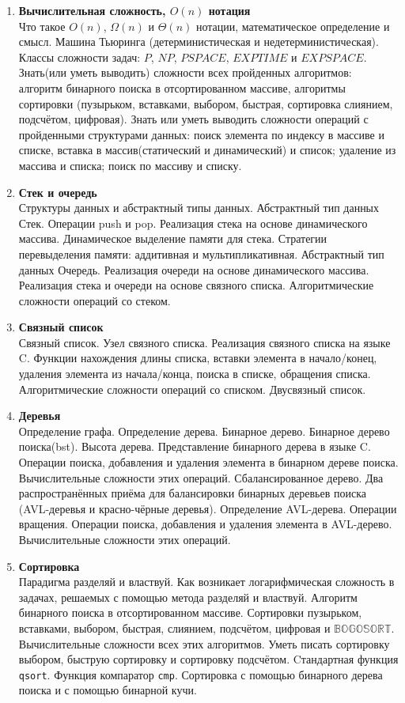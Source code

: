 \documentclass{article}
\begin{document}
\begin{enumerate}
\item  \textbf{Вычислительная сложность, $O(n)$ нотация}\\
Что такое $O(n)$, $\Omega(n)$ и $\Theta(n)$ нотации, математическое определение и смысл. Машина Тьюринга (детерминистическая и недетерминистическая). Классы сложности задач: $P$, $NP$, $PSPACE$, $EXPTIME$ и $EXPSPACE$.
Знать(или уметь выводить) сложности всех пройденных алгоритмов: алгоритм бинарного поиска в отсортированном массиве, алгоритмы сортировки (пузырьком, вставками, выбором, быстрая, сортировка слиянием, подсчётом, цифровая). Знать или уметь выводить сложности операций с пройденными структурами данных: поиск элемента по индексу в массиве и списке, вставка в массив(статический и динамический) и список; удаление из массива и списка; поиск по массиву и списку.


\item  \textbf{Стек и очередь}\\
Структуры данных и абстрактный типы данных. Абстрактный тип данных Стек. Операции push и pop. Реализация стека на основе динамического массива. Динамическое выделение памяти для стека. Стратегии перевыделения памяти: аддитивная и мультипликативная. Абстрактный тип данных Очередь. Реализация очереди на основе динамического массива. Реализация стека и очереди на основе связного списка. Алгоритмические сложности операций со стеком.

\item \textbf{Связный список}\\
Связный список. Узел связного списка. Реализация связного списка на языке C. Функции нахождения длины списка, вставки элемента в начало/конец, удаления элемента из начала/конца, поиска в списке, обращения списка. Алгоритмические сложности операций со списком. Двусвязный список.


\item \textbf{Деревья}\\
Определение графа. Определение дерева. Бинарное дерево. Бинарное дерево поиска(bst). Высота дерева. Представление бинарного дерева в языке C. Операции поиска, добавления и удаления элемента в бинарном дереве поиска. Вычислительные сложности этих операций. Сбалансированное дерево. Два распространённых приёма для балансировки бинарных деревьев поиска (AVL-деревья и красно-чёрные деревья). Определение AVL-дерева. Операции вращения. Операции поиска, добавления и удаления элемента в AVL-дерево. Вычислительные сложности этих операций.


\item \textbf{Сортировка}\\
Парадигма разделяй и властвуй. Как возникает логарифмическая сложность в задачах, решаемых с помощью метода разделяй и властвуй. Алгоритм бинарного поиска в отсортированном массиве.
Сортировки пузырьком, вставками, выбором, быстрая, слиянием, подсчётом, цифровая и $\mathbb{BOGOSORT}$. Вычислительные сложности всех этих алгоритмов. Уметь писать сортировку выбором, быструю сортировку и сортировку подсчётом. Cтандартная функция \texttt{qsort}. Функция компаратор \texttt{cmp}. Сортировка с помощью бинарного дерева поиска и с помощью бинарной кучи.



\end{enumerate}
\end{document}
